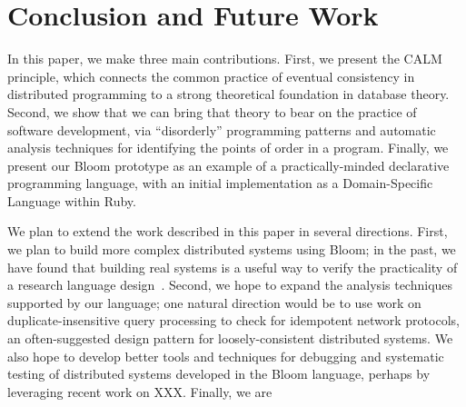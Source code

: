 \section{Conclusion and Future Work}
\label{sec:conclusion}
In this paper, we make three main contributions.  First, we present the CALM
principle, which connects the common practice of eventual consistency in
distributed programming to a strong theoretical foundation in database theory.
Second, we show that we can bring that theory to bear on the practice of
software development, via ``disorderly'' programming patterns and automatic
analysis techniques for identifying the points of order in a program. Finally,
we present our Bloom prototype as an example of a practically-minded declarative
programming language, with an initial implementation as a Domain-Specific
Language within Ruby.

We plan to extend the work described in this paper in several directions. First,
we plan to build more complex distributed systems using Bloom; in the past, we
have found that building real systems is a useful way to verify the practicality
of a research language design~\cite{boom-eurosys}.  Second, we hope to expand
the analysis techniques supported by our language; one natural direction would
be to use work on duplicate-insensitive query processing to check for idempotent
network protocols, an often-suggested design pattern for loosely-consistent
distributed systems. We also hope to develop better tools and techniques for
debugging and systematic testing of distributed systems developed in the Bloom
language, perhaps by leveraging recent work on XXX. Finally, we are

